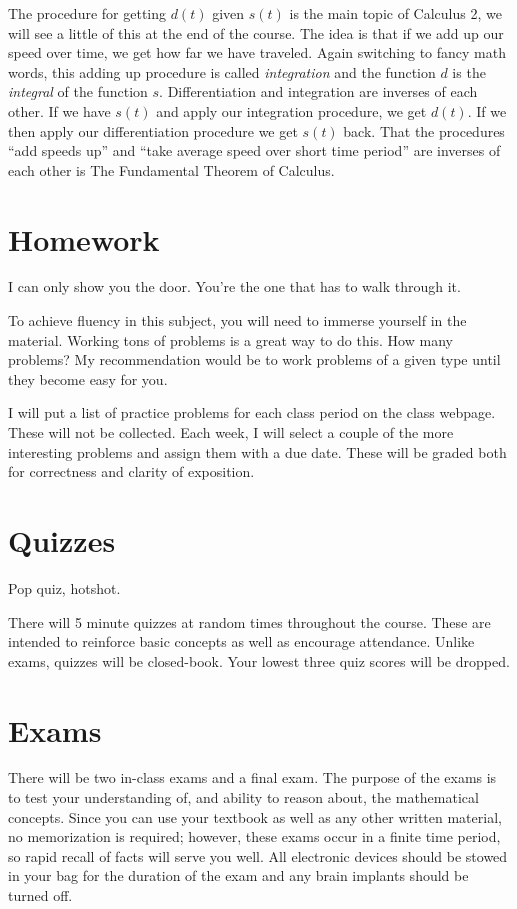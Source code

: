 \documentclass[12pt]{article}
\begin{document}
The procedure for getting $d(t)$ given $s(t)$ is the main topic of Calculus 2, we will see a little of this at the end of the course.  The idea is that if we add up our speed over time, we get how far we have traveled. Again switching to fancy math words, this adding up procedure is called \emph{integration} and the function $d$ is the \emph{integral} of the function $s$.  Differentiation and integration are inverses of each other. If we have $s(t)$ and apply our integration procedure, we get $d(t)$.  If we then apply our differentiation procedure we get $s(t)$ back.  That the procedures ``add speeds up'' and ``take average speed over short time period'' are inverses of each other is The Fundamental Theorem of Calculus.


\section*{Homework} 
\epigraph{I can only show you the door. You're the one that has to walk through it.}{}
To achieve fluency in this subject, you will need to immerse yourself in the material.  
Working tons of problems is a great way to do this.  How many problems?  
My recommendation would be to work problems of a given type until they become easy for you.

I will put a list of practice problems for each class period on the class webpage.  These will not be collected.  
Each week, I will select a couple of the more interesting problems and assign them with a due date.  
These will be graded both for correctness and clarity of exposition.

\section*{Quizzes}
\epigraph{Pop quiz, hotshot.}{}
There will 5 minute quizzes at random times throughout the course.  
These are intended to reinforce basic concepts as well as encourage attendance.
Unlike exams, quizzes will be closed-book.  Your lowest three quiz scores will be dropped.

\section*{Exams}
There will be two in-class exams and a final exam. 
The purpose of the exams is to test your understanding of, and ability to reason about, the mathematical concepts. Since you can use your textbook as well as any other written material, no memorization is required; however, these exams occur in a finite time period, so rapid recall of facts will serve you well.  All electronic devices should be stowed in your bag for the duration of the exam and any brain implants should be turned off.
\end{document}
